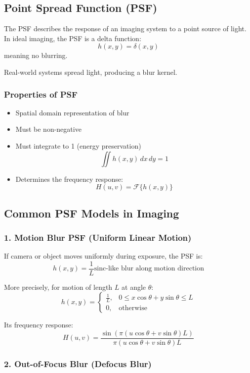 \documentclass{AnantDocumentation}
\begin{document}
\subsection{Point Spread Function (PSF)}

The PSF describes the response of an imaging system to a point source of light.  
In ideal imaging, the PSF is a delta function:
\[
h(x,y) = \delta(x,y)
\]
meaning no blurring.

Real-world systems spread light, producing a blur kernel.

\subsubsection{Properties of PSF}

\begin{itemize}
\item Spatial domain representation of blur
\item Must be non-negative
\item Must integrate to 1 (energy preservation)
\[
\iint h(x,y) \, dx\,dy = 1
\]
\item Determines the frequency response:
\[
H(u,v) = \mathcal{F}\{h(x,y)\}
\]
\end{itemize}

\subsection{Common PSF Models in Imaging}

\subsubsection{1. Motion Blur PSF (Uniform Linear Motion)}

If camera or object moves uniformly during exposure, the PSF is:
\[
h(x,y) = \frac{1}{L} \text{sinc-like blur along motion direction}
\]

More precisely, for motion of length \( L \) at angle \( \theta \):
\[
h(x,y) = 
\begin{cases}
\frac{1}{L}, & 0 \le x\cos\theta + y \sin\theta \le L \\
0, & \text{otherwise}
\end{cases}
\]

Its frequency response:
\[
H(u,v) = \frac{\sin(\pi (u\cos\theta + v\sin\theta)L)}
{\pi (u\cos\theta + v\sin\theta)L}
\]

\subsubsection{2. Out-of-Focus Blur (Defocus Blur)}
\end{document}
